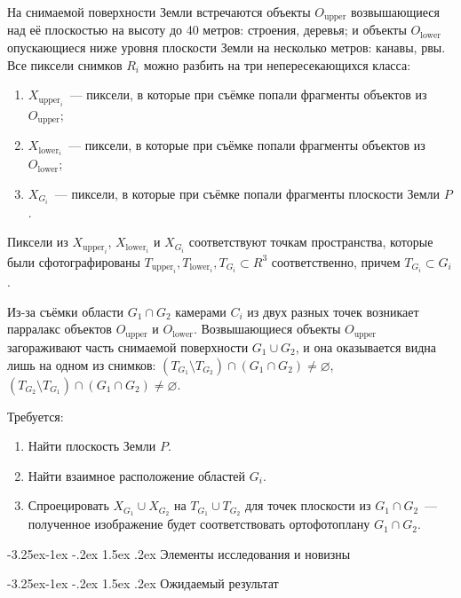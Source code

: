 \documentclass[a4paper,10pt]{article}
\makeatletter
\renewcommand\paragraph{\@startsection{paragraph}{4}{\z@}%
  {-3.25ex\@plus -1ex \@minus -.2ex}%
  {1.5ex \@plus .2ex}%
  {\normalfont\normalsize\bfseries}}
\makeatother
\begin{document}
На снимаемой поверхности Земли встречаются объекты $O_{\mathrm{upper}}$ возвышающиеся над её плоскостью на высоту до 40 метров: 
строения, деревья; 
и объекты $O_{\mathrm{lower}}$ опускающиеся ниже уровня плоскости Земли на несколько метров: канавы, рвы.
Все пиксели снимков $R_i$ можно разбить на три непересекающихся класса: 
\begin{enumerate}[label=\arabic*)]
  \item $X_{\mathrm{upper}_i}$~--- пиксели, в которые при съёмке попали фрагменты объектов из $O_{\mathrm{upper}}$;
  \item $X_{\mathrm{lower}_i}$~--- пиксели, в которые при съёмке попали фрагменты объектов из $O_{\mathrm{lower}}$;
  \item $X_{G_i}$~--- пиксели, в которые при съёмке попали фрагменты плоскости Земли $P$.
\end{enumerate}
Пиксели из $X_{\mathrm{upper}_i}$, $X_{\mathrm{lower}_i}$ и $X_{G_i}$ 
соответствуют точкам пространства, которые были сфотографированы 
$T_{\mathrm{upper}_i}, T_{\mathrm{lower}_i},  T_{G_i} \subset R^3$ соответственно, 
причем $T_{G_i} \subset G_i$.

Из-за съёмки области $G_1 \cap G_2$ камерами $C_i$ из двух разных точек 
возникает парралакс объектов $O_{\mathrm{upper}}$ и $O_{\mathrm{lower}}$.
Возвышающиеся объекты $O_{\mathrm{upper}}$ загораживают часть снимаемой поверхности $G_1 \cup G_2$, 
и она оказывается видна лишь на одном из снимков: $(T_{G_1} \setminus T_{G_2}) \cap (G_1 \cap G_2) \neq \varnothing$, 
$(T_{G_2} \setminus T_{G_1}) \cap (G_1 \cap G_2) \neq \varnothing$.

Требуется:
\begin{enumerate}
  \item Найти плоскость Земли $P$.
  \item Найти взаимное расположение областей $G_i$.
  \item Спроецировать $X_{G_1} \cup X_{G_2}$ на $T_{G_1} \cup T_{G_2}$ для точек плоскости из $G_1 \cap G_2$~---
  полученное изображение будет соответствовать ортофотоплану $G_1 \cap G_2$.
\end{enumerate}

\paragraph{Элементы исследования и новизны}


\paragraph{Ожидаемый результат}
\end{document}
